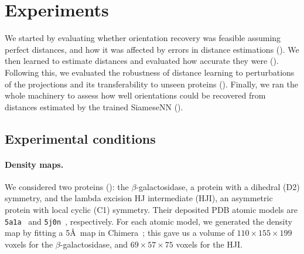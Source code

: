 \section{Experiments}\label{sec:experiments}


We started by evaluating whether orientation recovery  was feasible assuming perfect distances, and how it was affected by errors in distance estimations ().
We then learned to estimate distances  and evaluated how accurate they were ().
Following this, we evaluated the robustness of distance learning to perturbations of the projections and its transferability to unseen proteins ().
Finally, we ran the whole machinery to assess how well orientations could be recovered from distances estimated by the trained SiameseNN ().


\subsection{Experimental conditions}\label{sec:results:data}

\paragraph{Density maps.}
We considered two proteins (): the $\beta$-galactosidase, a protein with a dihedral (D2) symmetry, and the lambda excision HJ intermediate (HJI), an asymmetric protein with local cyclic (C1) symmetry.
Their deposited PDB atomic models are \texttt{5a1a}~\cite{bartesaghi2015betagal} and \texttt{5j0n}~\cite{laxmikanthan2016structure}, respectively.
For each atomic model, we generated the density map by fitting a 5\AA\ map in Chimera~\cite{pettersen2004ucsf}; this gave us a volume of $110 \times 155 \times 199$ voxels for the $\beta$-galactosidase, and $69 \times 57 \times 75$ voxels for the HJI\@.

